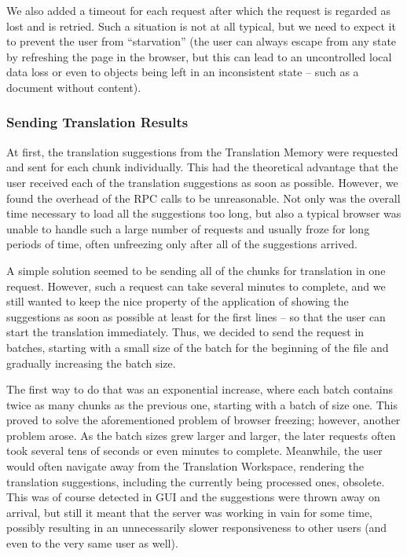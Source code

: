 We also added a timeout for each request after which the request is regarded as lost and is retried. Such a situation is not at all typical, but we need to expect  it to prevent the user from ``starvation'' (the user can always escape from any state by refreshing the page in the browser, but this can lead to an uncontrolled local data loss or even to objects being left in an inconsistent state -- such as a document without content).

\subsubsection{Sending Translation Results}

At first, the translation suggestions from the Translation Memory were requested and sent for each chunk individually. This had the theoretical advantage that the user received each of the translation suggestions as soon as possible. However, we found the overhead of the RPC calls to be unreasonable. Not only was the overall time necessary to load all the suggestions too long, but also a typical browser was unable to handle such a large number of requests and usually froze for long periods of time, often unfreezing only after all of the suggestions arrived.

A simple solution seemed to be sending all of the chunks for translation in one request. However, such a request can take several minutes to complete, and we still wanted to keep the nice property of the application of showing the suggestions as soon as possible at least for the first lines -- so that the user can start the translation immediately. Thus, we decided to send the request in batches, starting with a small size of the batch for the beginning of the file and gradually increasing the batch size.

The first way to do that was an exponential increase, where each batch contains twice as many chunks as the previous one, starting with a batch of size one. This proved to solve the aforementioned problem of browser freezing; however, another problem arose. As the batch sizes grew larger and larger, the later requests often took several tens of seconds or even minutes to complete. Meanwhile, the user would often navigate away from the Translation Workspace, rendering the translation suggestions, including the currently being processed ones, obsolete. This was of course detected in GUI and the suggestions were thrown away on arrival, but still it meant that the server was working in vain for some time, possibly resulting in an unnecessarily slower responsiveness to other users (and even to the very same user as well).

